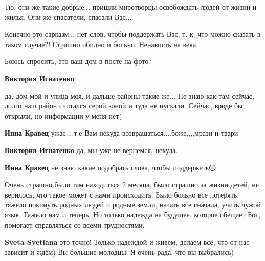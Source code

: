  
 
 
 
 

\qqSecCmt


Тю, они же такие добрые... пришли миротворцы освобождать людей от жизни и
жилья. Они же спасатели, спасали Вас...

Конечно это сарказм... нет слов, чтобы поддержать Вас, т. к. что можно сказать
в таком случае?! Страшно обидно и больно. Ненависть на века.

Боюсь спросить, это ваш дом в посте на фото?

\begin{itemize} %
\textbf{Виктория Игнатенко} 

да, дом мой и улица моя, и дальше районы такие же... Не знаю как там сейчас,
долго наш район считался серой зоной и туда не пускали. Сейчас, вроде бы,
открыли, но информации у меня нет(

\textbf{Инна Кравец} ужас....т.е Вам некуда возвращаться....боже,,,,мрази и твари

\textbf{Виктория Игнатенко} да, мы уже не вернёмся, некуда.

\textbf{Инна Кравец} не знаю какие подобрать слова, чтобы поддержать😔
\end{itemize} %


Очень страшно было там находиться 2 месяца, было страшно за жизни детей, не
верилось, что такое может с нами происходить. Было больно все потерять, тяжело
покинуть родных людей и родные земли, начать все сначала, учить чужой язык.
Тяжело нам и теперь. Но только надежда на будущее, которое обещает Бог,
помогает справляться со всеми трудностями.

\begin{itemize} %
\textbf{Sveta Svetlana} это точно! Только надеждой и живём, делаем всё, что от нас зависит и ждём) Вы большие молодцы! Я очень рада, что вы выбрались)
\end{itemize} %


